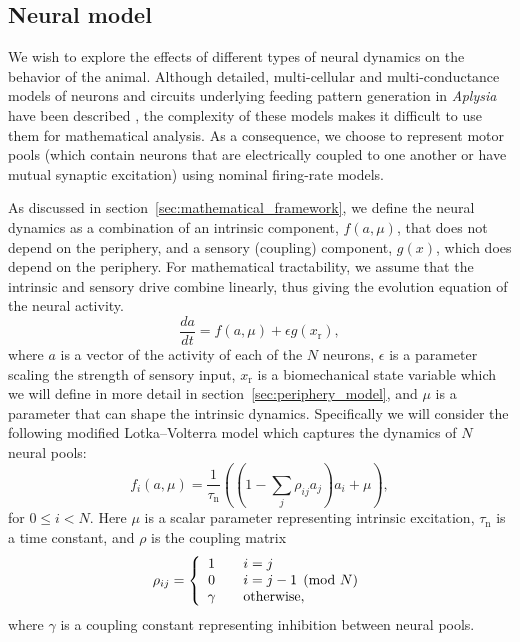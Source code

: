 \subsection{Neural model}
\label{sec:neural_model}

We wish to explore the effects of different types of neural dynamics on the
behavior of the animal.  Although detailed, multi-cellular and
multi-conductance models of neurons and circuits underlying feeding pattern
generation in \textit{Aplysia} have been described \citep{baxter_feeding_2006,
cataldo_computational_2006, susswein_mechanisms_2002}, the complexity of these
models makes it difficult to use them for mathematical analysis.  As a
consequence, we choose to represent motor pools (which contain neurons that are
electrically coupled to one another or have mutual synaptic excitation) using
nominal firing-rate models.

As discussed in section~\ref{sec:mathematical_framework}, we define the neural
dynamics as a combination of an intrinsic component, $f(a, \mu)$, that does
not depend on the periphery, and a sensory (coupling) component, $g(x)$, which
does depend on the periphery.  For mathematical tractability, we assume that
the intrinsic and sensory drive combine linearly, thus giving the evolution
equation of the neural activity.
\begin{equation}
\label{eq:neural_dynamics}
\frac{da}{dt} = f(a, \mu) + \epsilon g(x_\textrm{r}),
\end{equation}
where $a$ is a vector of the activity of each of the $N$ neurons, $\epsilon$
is a parameter scaling the strength of sensory input, $x_\textrm{r}$ is
a biomechanical state variable which we will define in more detail in
section~\ref{sec:periphery_model}, and $\mu$ is a parameter that can shape
the intrinsic dynamics.  Specifically we will consider the following
modified Lotka--Volterra model which captures the dynamics of $N$ neural pools:
\begin{equation}
    \label{eq:f_def_generic}
    f_i(a,\mu) = \frac{1}{\tau_\textrm{n}}\left(\left(1 - \sum_j \rho_{ij} a_j \right) a_i + \mu\right),
\end{equation}
for $0 \le i < N$.
Here $\mu$ is a scalar parameter
representing intrinsic excitation, $\tau_\textrm{n}$ is a time constant, and $\rho$ is the
coupling matrix
\begin{equation}
    \rho_{ij} = \left\{\begin{array}{c@{\qquad}l}
        1 & i = j \\
        0 & i = j - 1 \pmod{N} \\
        \gamma & \textrm{otherwise},
    \end{array}\right.
\end{equation}
where $\gamma$ is a coupling constant representing inhibition between neural
pools.

